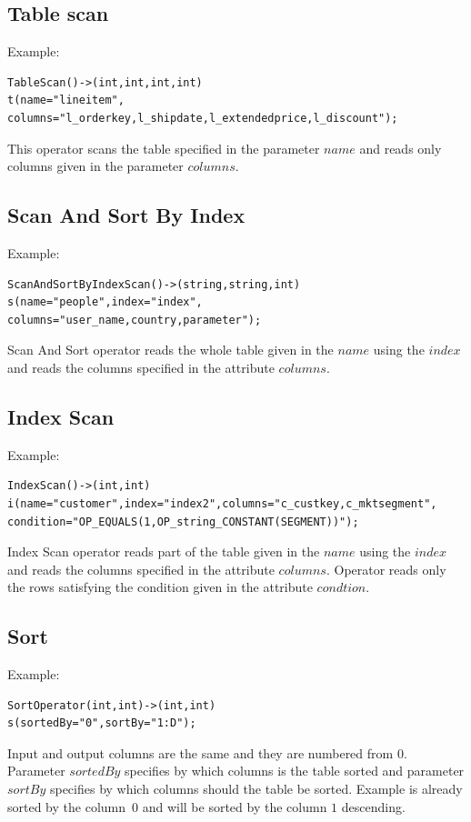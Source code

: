 \subsection{Table scan}
Example:
\begin{lstlisting}
TableScan()->(int,int,int,int)
t(name="lineitem",
columns="l_orderkey,l_shipdate,l_extendedprice,l_discount");
\end{lstlisting}
This operator scans the table specified in the parameter $name$ and reads only columns given in the parameter $columns$.

\subsection{Scan And Sort By Index}
Example:
\begin{lstlisting}
ScanAndSortByIndexScan()->(string,string,int)
s(name="people",index="index",
columns="user_name,country,parameter"); 
\end{lstlisting}
Scan And Sort operator reads the whole table given in the $name$ using the $index$ and reads the columns specified in the attribute $columns$.

\subsection{Index Scan}

Example:
\begin{lstlisting}
IndexScan()->(int,int)
i(name="customer",index="index2",columns="c_custkey,c_mktsegment",
condition="OP_EQUALS(1,OP_string_CONSTANT(SEGMENT))");
\end{lstlisting}
Index Scan operator reads part of the table given in the $name$ using the $index$ and reads the columns specified in the attribute $columns$. Operator reads only the rows satisfying the condition given in the attribute $condtion$.



\subsection{Sort}
Example:
\begin{lstlisting}
SortOperator(int,int)->(int,int)
s(sortedBy="0",sortBy="1:D");
\end{lstlisting}
Input and output columns are the same and they are numbered from $0$. Parameter $sortedBy$ specifies by which columns is the table sorted and parameter $sortBy$ specifies by which columns should the table be sorted. Example is already sorted by the column~$0$ and will be sorted by the column $1$ descending.


